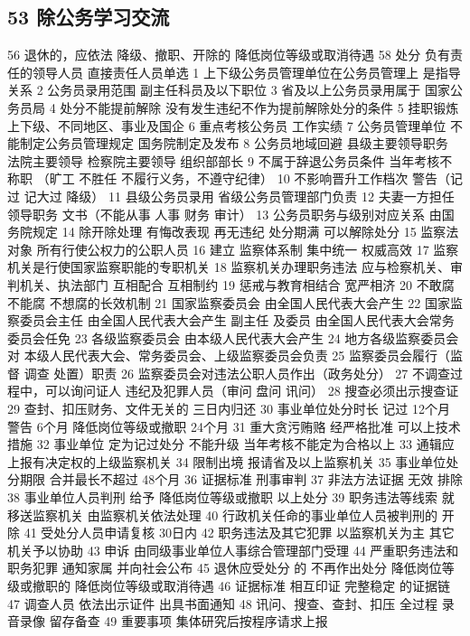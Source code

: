 \documentclass[cyan]{elegantnote}
\begin{document}
\subsection{53 除公务学习交流}
\label{sec:org9e1894a}
56 退休的，应依法
降级、撤职、开除的 降低岗位等级或取消待遇
58 处分
负有责任的领导人员
直接责任人员单选
1 上下级公务员管理单位在公务员管理上
是指导关系
2 公务员录用范围
副主任科员及以下职位
3 省及以上公务员录用属于
国家公务员局
4 处分不能提前解除
没有发生违纪不作为提前解除处分的条件
5 挂职锻炼
上下级、不同地区、事业及国企
6 重点考核公务员
工作实绩
7 公务员管理单位
不能制定公务员管理规定
国务院制定及发布
8 公务员地域回避
县级主要领导职务
法院主要领导
检察院主要领导
组织部部长
9 不属于辞退公务员条件
当年考核不称职
（旷工 不胜任 不履行义务，不遵守纪律）
10 不影响晋升工作档次
警告（记过 记大过 降级）
11 县级公务员录用
省级公务员管理部门负责
12 夫妻一方担任领导职务
文书（不能从事 人事 财务 审计）
13 公务员职务与级别对应关系
由国务院规定
14 除开除处理
有悔改表现 再无违纪 处分期满 可以解除处分
15 监察法对象
所有行使公权力的公职人员
16 建立 监察体系制
集中统一 权威高效
17 监察机关是行使国家监察职能的专职机关
18 监察机关办理职务违法 应与检察机关、审判机关、执法部门
互相配合 互相制约
19 惩戒与教育相结合 宽严相济
20 不敢腐 不能腐 不想腐的长效机制
21 国家监察委员会
由全国人民代表大会产生
22 国家监察委员会主任 由全国人民代表大会产生 副主任 及委员
由全国人民代表大会常务委员会任免
23 各级监察委员会
由本级人民代表大会产生
24 地方各级监察委员会对
本级人民代表大会、常务委员会、上级监察委员会负责
25 监察委员会履行（监督 调查 处置）职责
26 监察委员会对违法公职人员作出（政务处分）
27 不调查过程中，可以询问证人
违纪及犯罪人员（审问 盘问 讯问）
28 搜查必须出示搜查证
29 查封、扣压财务、文件无关的
三日内归还
30 事业单位处分时长
记过 12个月
警告 6个月
降低岗位等级或撤职 24个月
31 重大贪污贿赂 经严格批准 可以上技术措施
32 事业单位 定为记过处分 不能升级 当年考核不能定为合格以上
33 通辑应上报有决定权的上级监察机关
34 限制出境
报请省及以上监察机关
35 事业单位处分期限 合并最长不超过
48个月
36 证据标准
刑事审判
37 非法方法证据
无效 排除
38 事业单位人员判刑
给予 降低岗位等级或撤职 以上处分
39 职务违法等线索
就移送监察机关 由监察机关依法处理
40 行政机关任命的事业单位人员被判刑的
开除
41 受处分人员申请复核
   30日内
42 职务违法及其它犯罪
以监察机关为主 其它机关予以协助
43 申诉
由同级事业单位人事综合管理部门受理
44 严重职务违法和职务犯罪
通知家属 并向社会公布
45 退休应受处分 的
不再作出处分 降低岗位等级或撤职的 降低岗位等级或取消待遇
46 证据标准
相互印证 完整稳定 的证据链
47 调查人员
依法出示证件 出具书面通知
48 讯问、搜查、查封、扣压
全过程 录音录像 留存备查
49 重要事项
集体研究后按程序请求上报
\end{document}
